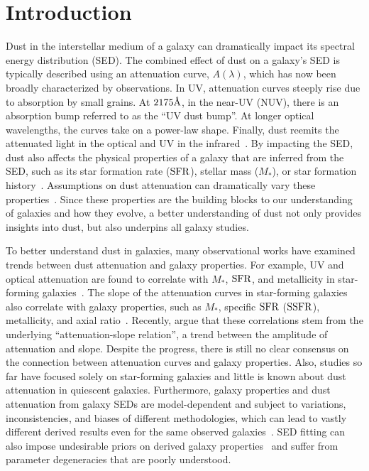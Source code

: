 \section{Introduction} \label{sec:intro} 
Dust in the interstellar medium of a galaxy can dramatically impact its
spectral energy distribution (SED). %
The combined effect of dust on a galaxy's SED is typically described using
an attenuation curve, $A(\lambda)$, which has now been broadly characterized 
by observations. 
In UV, attenuation curves steeply rise due to absorption by small grains.
At $2175\AA$, in the near-UV (NUV), there is an absorption bump referred to as
the ``UV dust bump''. 
At longer optical wavelengths, the curves take on a power-law shape. 
Finally, dust reemits the attenuated light in the optical and UV in the
infrared~\citep[for an overview see][]{calzetti2001, draine2003,
galliano2018}.
By impacting the SED, dust also affects the physical properties of a galaxy
that are inferred from the SED, such as its star formation rate (${\rm SFR}$),
stellar mass ($M_*$), or star formation history~\citep[see reviews by][]{walcher2011,
conroy2013}. 
Assumptions on dust attenuation can dramatically vary these
properties~\citep{kriek2013, reddy2015, salim2016, salim2020}.
Since these properties are the building blocks to our understanding of
galaxies and how they evolve, a better understanding of dust not only provides
insights into dust, but also underpins all galaxy studies.  

To better understand dust in galaxies, many observational works have
examined trends between dust attenuation and galaxy properties.
For example, UV and optical attenuation are found to correlate with 
$M_*$, ${\rm SFR}$, and metallicity in star-forming
galaxies~\citep{garn2010, battisti2016}. 
The slope of the attenuation curves in star-forming galaxies also correlate
with galaxy properties, such as $M_*$, specific ${\rm SFR}$ (${\rm SSFR}$),
metallicity, and axial ratio~\citep{wild2011, battisti2017}. 
Recently, \cite{salim2018} argue that these correlations stem from the
underlying ``attenuation-slope relation'', a trend between the amplitude of
attenuation and slope. 
Despite the progress, there is still no clear consensus on the connection
between attenuation curves and galaxy properties.
Also, studies so far have focused solely on star-forming galaxies and little is known
about dust attenuation in quiescent galaxies. 
Furthermore, galaxy properties and dust attenuation from
galaxy SEDs are model-dependent and subject to variations, inconsistencies, and biases of
different methodologies, which can 
lead to vastly different derived results even for the same observed galaxies~\citep[\eg][see also Section~\ref{sec:slab}]{speagle2014, katsianis2020}.
SED fitting can also impose undesirable priors on derived galaxy
properties~\citep{carnall2018, leja2019} and suffer from parameter
degeneracies that are poorly understood. 

